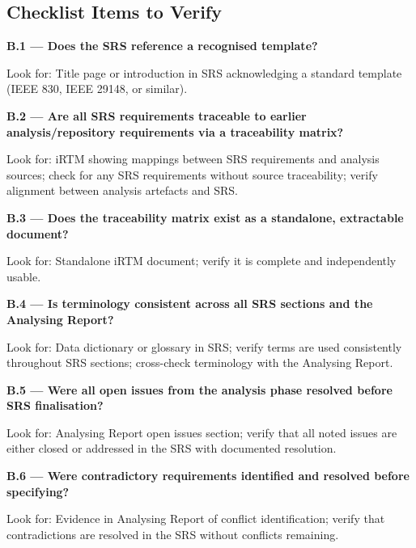 \documentclass[11pt,a4paper]{article}
\begin{document}
\subsection*{Checklist Items to Verify}

\textbf{B.1 --- Does the SRS reference a recognised template?}

Look for: Title page or introduction in SRS acknowledging a standard template (IEEE 830, IEEE 29148, or similar).

\vspace{0.4em}

\textbf{B.2 --- Are all SRS requirements traceable to earlier analysis/repository requirements via a traceability matrix?}

Look for: iRTM showing mappings between SRS requirements and analysis sources; check for any SRS requirements without source traceability; verify alignment between analysis artefacts and SRS.

\vspace{0.4em}

\textbf{B.3 --- Does the traceability matrix exist as a standalone, extractable document?}

Look for: Standalone iRTM document; verify it is complete and independently usable.

\vspace{0.4em}

\textbf{B.4 --- Is terminology consistent across all SRS sections and the Analysing Report?}

Look for: Data dictionary or glossary in SRS; verify terms are used consistently throughout SRS sections; cross-check terminology with the Analysing Report.

\vspace{0.4em}

\textbf{B.5 --- Were all open issues from the analysis phase resolved before SRS finalisation?}

Look for: Analysing Report open issues section; verify that all noted issues are either closed or addressed in the SRS with documented resolution.

\vspace{0.4em}

\textbf{B.6 --- Were contradictory requirements identified and resolved before specifying?}

Look for: Evidence in Analysing Report of conflict identification; verify that contradictions are resolved in the SRS without conflicts remaining.
\end{document}
